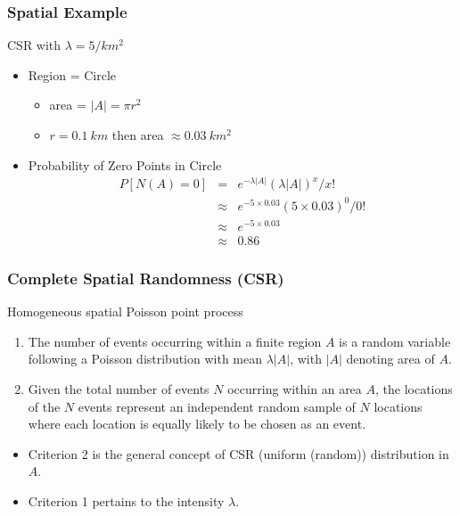 \documentclass[nototal,handout]{beamer}
\begin{document}
   \begin{frame}
     \frametitle{Spatial Example}
     \begin{block}{CSR with $\lambda = 5/km^2$}
       \begin{itemize}
	 \item Region = Circle
	   \begin{itemize}
	     \item area = $|A| = \pi r^2$
	     \item $r=0.1\ km$ then area $\approx 0.03 \ km^2$
	   \end{itemize}
	 \item Probability of Zero Points in Circle
	   \begin{eqnarray}
	     P[N(A) = 0] &= &  e^{-\lambda |A|} (\lambda |A|)^x /x!\\
	                 &\approx&e^{-5 \times 0.03} (5 \times 0.03)^0 /0!\\
	                 &\approx&e^{-5 \times 0.03} \\
	                 &\approx&0.86
	   \end{eqnarray}
       \end{itemize}
      \end{block}
    \end{frame}


 \begin{frame}[<+->]
   \frametitle{Complete Spatial Randomness (CSR)}
   \begin{block}{Homogeneous spatial Poisson point process}
     \begin{enumerate}
       \item The number of events occurring within a finite region $A$ is a
	 random variable following a Poisson distribution with mean
	 $\lambda|A|$, with $|A|$ denoting area of $A$.
       \item Given the total number of events $N$ occurring within an area $A$,
	 the locations of the $N$ events represent an independent random
	 sample of $N$ locations where each location is equally likely to be
	 chosen as an event.
     \end{enumerate}
   \end{block}
   \begin{block}{}
     \begin{itemize}
       \item Criterion 2 is the general concept of CSR (uniform (random))
	 distribution in $A$.
       \item Criterion 1 pertains to the intensity $\lambda$.
     \end{itemize}

    \end{block}

\end{frame}
\end{document}

